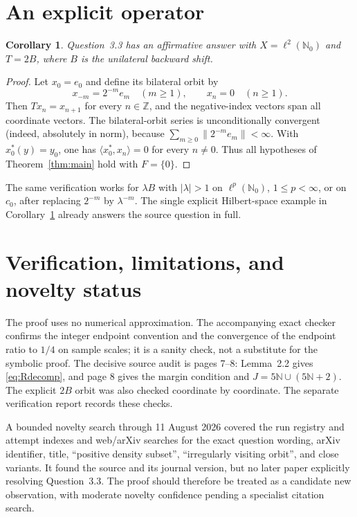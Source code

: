 \documentclass[10pt]{article}
\newtheorem{corollary}[theorem]{Corollary}
\newcommand{\N}{\mathbb N}
\begin{document}
\section{An explicit operator}

\begin{corollary}\label{cor:shift}
Question~3.3 has an affirmative answer with $X=\ell^2(\N_0)$ and
$T=2B$, where $B$ is the unilateral backward shift.
\end{corollary}

\begin{proof}
Let $x_0=e_0$ and define its bilateral orbit by
\[
 x_{-m}=2^{-m}e_m\quad(m\geq1),
 \qquad x_n=0\quad(n\geq1).
\]
Then $Tx_n=x_{n+1}$ for every $n\in\mathbb Z$, and the negative-index
vectors span all coordinate vectors.  The bilateral-orbit series is
unconditionally convergent (indeed, absolutely in norm), because
$\sum_{m\geq0}\|2^{-m}e_m\|<\infty$.  With
$x_0^*(y)=y_0$, one has
$\langle x_0^*,x_n\rangle=0$ for every $n\ne0$.  Thus all hypotheses of
Theorem~\ref{thm:main} hold with $F=\{0\}$.
\end{proof}

The same verification works for $\lambda B$ with $|\lambda|>1$ on
$\ell^p(\N_0)$, $1\leq p<\infty$, or on $c_0$, after replacing
$2^{-m}$ by $\lambda^{-m}$.  The single explicit Hilbert-space example in
Corollary~\ref{cor:shift} already answers the source question in full.

\section{Verification, limitations, and novelty status}

The proof uses no numerical approximation.  The accompanying exact checker
confirms the integer endpoint convention and the convergence of the endpoint
ratio to $1/4$ on sample scales; it is a sanity check, not a substitute for
the symbolic proof.  The decisive source audit is pages 7--8: Lemma~2.2 gives
\eqref{eq:Rdecomp}, and page 8 gives the margin condition and
$J=5\N\cup(5\N+2)$.  The explicit $2B$ orbit was also checked coordinate by
coordinate.  The separate verification report records these checks.

A bounded novelty search through 11 August 2026 covered the run registry and
attempt indexes and web/arXiv searches for the exact question wording,
arXiv identifier, title, ``positive density subset'', ``irregularly visiting
orbit'', and close variants.  It found the source and its journal version,
but no later paper explicitly resolving Question~3.3.  The proof should
therefore be treated as a candidate new observation, with moderate novelty
confidence pending a specialist citation search.
\end{document}
